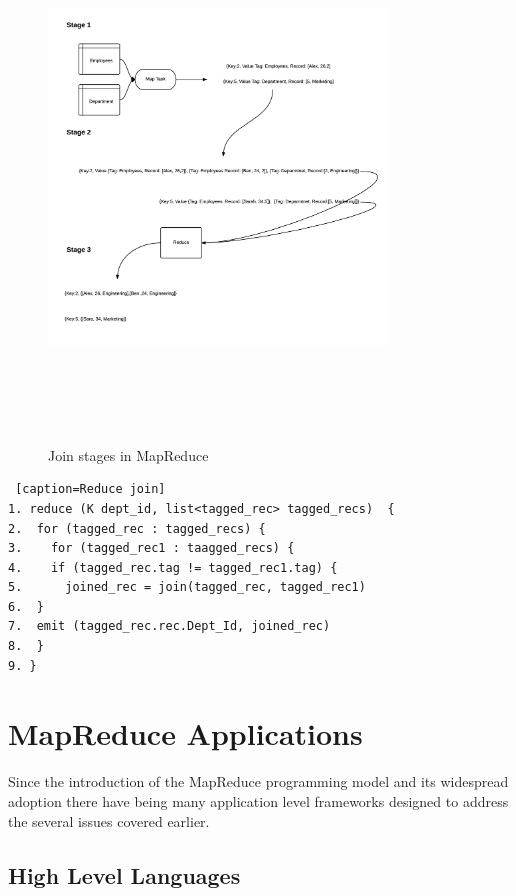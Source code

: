 \documentclass[10pt,twocolumn]{IEEEtran11}
\begin{document}
\begin{figure}[h]
	\centering
	\includegraphics[height = 14cm,width=9cm]{images/mapReduceJoin.png}
	\caption{Join stages in MapReduce}
	\label{fig:mrJoin}
\end{figure}

\begin{lstlisting} [caption=Reduce join]
1. reduce (K dept_id, list<tagged_rec> tagged_recs)  {
2.  for (tagged_rec : tagged_recs) {
3.    for (tagged_rec1 : taagged_recs) {
4.	  if (tagged_rec.tag != tagged_rec1.tag) {
5.	    joined_rec = join(tagged_rec, tagged_rec1)
6.  }
7.  emit (tagged_rec.rec.Dept_Id, joined_rec)
8.  }
9. }
\end{lstlisting}


\section{MapReduce Applications}

Since the introduction of the MapReduce programming model and its widespread adoption there have being many application level frameworks designed to address the several issues covered earlier.

\subsection{High Level Languages}
\end{document}
